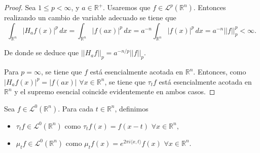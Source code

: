 \begin{proof}
Sea $ 1\leq p < \infty$, y $a \in \mathbb{R}^+$. Usaremos que $f \in \mathscr{L}^p(\mathbb{R}^n)$. Entonces realizando un cambio de variable adecuado se tiene que
\begin{equation}
       \int_{\mathbb{R}^n} |H_af(x)|^p  \, dx =\int_{\mathbb{R}^n} |f(ax)|^p  \, dx =  a^{-n}\int_{\mathbb{R}^n} |f(x)|^p  \, dx = a^{-n}||f||_p^p< \infty.
\end{equation}
    
\noindent De donde se deduce que $||H_af||_p = a^{-n/p}||f||_p$.
\vspace{0.2cm}

\noindent Para $p= \infty$, se tiene que $f$ está esencialmente acotada en $\mathbb{R}^n$. Entonces, 
  como $|H_af(x)|^p= |f(ax)|  \,\, \forall x \in \mathbb{R}^n$, se tiene que $\tau_t{f}$ está esencialmente acotada en $\mathbb{R}^n$ y  el supremo esencial coincide evidentemente en ambos casos.
\end{proof}




\begin{definicion}
Sea $f \in \mathscr{L}^0(\mathbb{R}^n)$. Para cada $t \in \mathbb{R}^n$, definimos 
\begin{itemize}
    \item $\tau_tf \in \mathscr{L}^0(\mathbb{R}^n) $ como $\tau_tf(x)=f(x-t) \,\,\forall x \in \mathbb{R}^n,$
    \item $\mu_tf \in \mathscr{L}^0(\mathbb{R}^n) $ como $\mu_tf(x)=e^{2 \pi i  \langle x, t \rangle}f(x) \,\, \forall x \in \mathbb{R}^n$.
\end{itemize}
\end{definicion}


